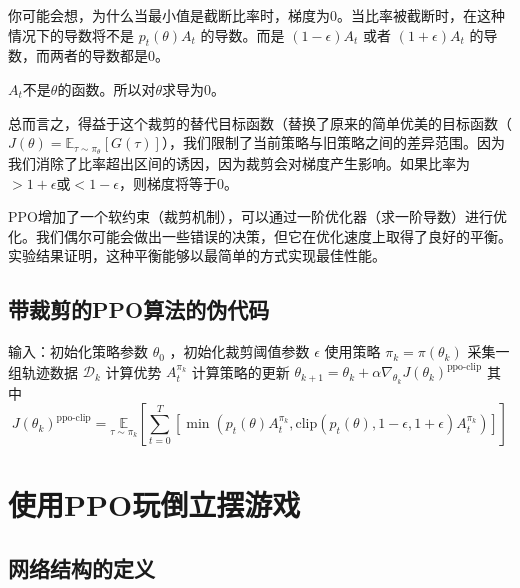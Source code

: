 \documentclass[lang=cn,newtx,10pt,scheme=chinese]{elegantbook}
\begin{document}
你可能会想，为什么当最小值是截断比率时，梯度为0。当比率被截断时，在这种情况下的导数将不是 $p_t(\theta)A_t$ 的导数。而是 $(1-\epsilon)A_t$ 或者 $(1+\epsilon)A_t$ 的导数，而两者的导数都是0。

\begin{marker}
$A_t$不是$\theta$的函数。所以对$\theta$求导为0。
\end{marker}

总而言之，得益于这个裁剪的替代目标函数（替换了原来的简单优美的目标函数（$J(\theta)=\mathbb{E}_{\tau\sim\pi_{\theta}}[G(\tau)]$），我们限制了当前策略与旧策略之间的差异范围。因为我们消除了比率超出区间的诱因，因为裁剪会对梯度产生影响。如果比率为$>1+\epsilon$或$<1-\epsilon$，则梯度将等于$0$。

PPO增加了一个软约束（裁剪机制），可以通过一阶优化器（求一阶导数）进行优化。我们偶尔可能会做出一些错误的决策，但它在优化速度上取得了良好的平衡。实验结果证明，这种平衡能够以最简单的方式实现最佳性能。

\section{带裁剪的PPO算法的伪代码}

\begin{algorithm}
\caption{带裁剪目标的PPO}\label{algo:ppo-clip}
\begin{algorithmic}[1]
\State 输入：初始化策略参数 $\theta_0$ ，初始化裁剪阈值参数 $\epsilon$
\State 使用策略 $\pi_k=\pi(\theta_k)$ 采集一组轨迹数据 $\mathcal{D}_k$
\State 计算优势 $A_t^{\pi_k}$
\State 计算策略的更新
\State $\theta_{k+1}=\theta_k+\alpha\nabla_{\theta_k}J(\theta_k)^{\text{ppo-clip}}$
\State 其中
$$
J(\theta_k)^{\text{ppo-clip}}=\underset{\tau\sim\pi_k}{\mathbb{E}}\left[{\sum_{t=0}^T[\min(p_t(\theta)A_t^{\pi_k},\text{clip}(p_t(\theta),1-\epsilon,1+\epsilon)A_t^{\pi_k})]}\right]
$$
\EndFor
\end{algorithmic}
\end{algorithm}

\chapter{使用PPO玩倒立摆游戏}

\section{网络结构的定义}
\end{document}
